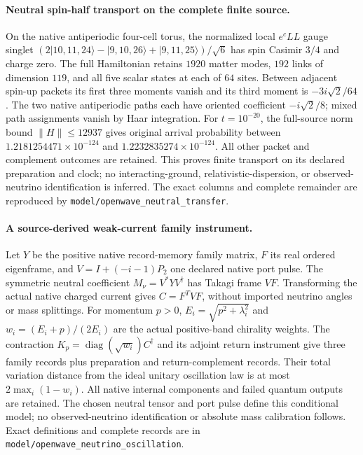 \paragraph{Neutral spin-half transport on the complete finite source.}
On the native antiperiodic four-cell torus, the normalized local
$e^cLL$ gauge singlet $(2|10,11,24\rangle-|9,10,26\rangle+
|9,11,25\rangle)/\sqrt6$ has spin Casimir $3/4$ and charge zero.
The full Hamiltonian retains $1920$ matter modes, $192$ links of dimension
$119$, and all five scalar states at each of $64$ sites. Between adjacent
spin-up packets its first three moments vanish and its third moment is
$-3i\sqrt2/64$. The two native antiperiodic paths each have oriented
coefficient $-i\sqrt2/8$; mixed path assignments vanish by Haar integration.
For $t=10^{-20}$, the full-source norm bound $\|H\|\le12937$ gives original
arrival probability between $1.2181254471\times10^{-124}$ and
$1.2232835274\times10^{-124}$. All other packet and complement outcomes are
retained. This proves finite transport on its declared preparation and
clock; no interacting-ground, relativistic-dispersion, or observed-neutrino
identification is inferred. The exact columns and complete remainder are
reproduced by \texttt{model/openwave\_neutral\_transfer}.


\paragraph{A source-derived weak-current family instrument.}
Let $Y$ be the positive native record-memory family matrix, $F$ its real
ordered eigenframe, and $V=I+(-i-1)P_2$ one declared native port pulse.
The symmetric neutral coefficient $M_\nu=V^*YV^\dagger$ has Takagi frame
$VF$. Transforming the actual native charged current gives
$C=F^TVF$, without imported neutrino angles or mass splittings. For momentum
$p>0$, $E_i=\sqrt{p^2+\lambda_i^2}$ and
$w_i=(E_i+p)/(2E_i)$ are the actual positive-band chirality weights.
The contraction $K_p=\operatorname{diag}(\sqrt{w_i})C^\dagger$ and its
adjoint return instrument give three family records plus preparation and
return-complement records. Their total variation distance from the ideal
unitary oscillation law is at most $2\max_i(1-w_i)$.
All native internal components and failed quantum outputs are retained.
The chosen neutral tensor and port pulse define this conditional model;
no observed-neutrino identification or absolute mass calibration follows.
Exact definitions and complete records are in
\texttt{model/openwave\_neutrino\_oscillation}.


